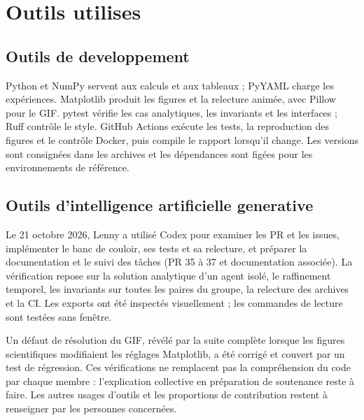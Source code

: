 \section{Outils utilises}

%
%

\subsection{Outils de developpement}

Python et NumPy servent aux calculs et aux tableaux ; PyYAML charge les expériences.
Matplotlib produit les figures et la relecture animée, avec Pillow pour le GIF.
pytest vérifie les cas analytiques, les invariants et les interfaces ; Ruff contrôle
le style. GitHub Actions exécute les tests, la reproduction des figures et le contrôle
Docker, puis compile le rapport lorsqu'il change. Les versions sont consignées dans
les archives et les dépendances sont figées pour les environnements de référence.

\subsection{Outils d'intelligence artificielle generative}

Le 21 octobre 2026, Lenny a utilisé Codex pour examiner les PR et les issues,
implémenter le banc de couloir, ses tests et sa relecture, et préparer la documentation
et le suivi des tâches (PR 35 à 37 et documentation associée). La vérification repose
sur la solution analytique d'un agent isolé, le raffinement temporel, les invariants
sur toutes les paires du groupe, la relecture des archives et la CI. Les exports ont
été inspectés visuellement ; les commandes de lecture sont testées sans fenêtre.

Un défaut de résolution du GIF, révélé par la suite complète lorsque les figures
scientifiques modifiaient les réglages Matplotlib, a été corrigé et couvert par un
test de régression. Ces vérifications ne remplacent pas la compréhension du code
par chaque membre : l'explication collective en préparation de soutenance reste à faire.
Les autres usages d'outils et les proportions de contribution restent à renseigner
par les personnes concernées.

